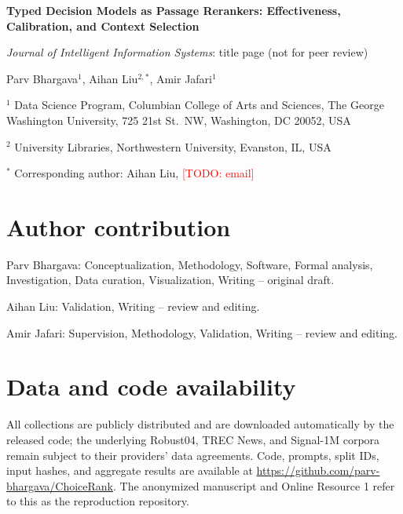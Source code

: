 \documentclass[11pt,a4paper]{article}
\begin{document}
\begin{center}

{\Large\bfseries
Typed Decision Models as Passage Rerankers: Effectiveness, Calibration, and Context Selection
\par}

\vspace{0.4cm}
\textit{Journal of Intelligent Information Systems}: title page (not for peer review)

\vspace{1cm}

Parv Bhargava$^{1}$,
Aihan Liu$^{2,*}$,
Amir Jafari$^{1}$

\vspace{0.6cm}

\small
$^{1}$ Data Science Program, Columbian College of Arts and Sciences, The George Washington University, 725 21st St.\ NW, Washington, DC 20052, USA

$^{2}$ University Libraries, Northwestern University, Evanston, IL, USA

\vspace{0.3cm}
$^{*}$ Corresponding author: Aihan Liu, \textcolor{red}{[TODO: email]}

\end{center}

\vspace{0.8cm}

\section*{Author contribution}

Parv Bhargava: Conceptualization, Methodology, Software, Formal analysis, Investigation, Data curation, Visualization, Writing -- original draft.

Aihan Liu: Validation, Writing -- review and editing.

Amir Jafari: Supervision, Methodology, Validation, Writing -- review and editing.

\section*{Data and code availability}

All collections are publicly distributed and are downloaded automatically by the released code; the underlying Robust04, TREC News, and Signal-1M corpora remain subject to their providers' data agreements. Code, prompts, split IDs, input hashes, and aggregate results are available at \url{https://github.com/parv-bhargava/ChoiceRank}. The anonymized manuscript and Online Resource 1 refer to this as the reproduction repository.
\end{document}
